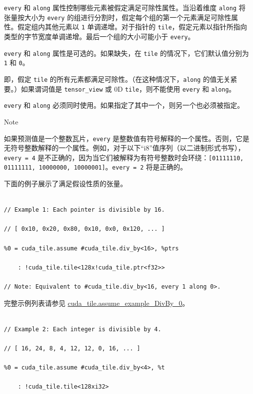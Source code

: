 \documentclass{article}
\begin{document}
\texttt{every} 和 \texttt{along} 属性控制哪些元素被假定满足可除性属性。当沿着维度 \texttt{along} 将张量按大小为 \texttt{every} 的组进行分割时，假定每个组的第一个元素满足可除性属性。假定组内其他元素以 \texttt{1} 单调递增。对于指针的 \texttt{tile}，假定元素以指针所指向类型的字节宽度单调递增。最后一个组的大小可能小于 \texttt{every}。



\texttt{every} 和 \texttt{along} 属性是可选的。如果缺失，在 \texttt{tile} 的情况下，它们默认值分别为 \texttt{1} 和 \texttt{0}。

即，假定 \texttt{tile} 的所有元素都满足可除性。（在这种情况下，\texttt{along} 的值无关紧要。）如果谓词值是 \texttt{tensor\_view} 或 0D \texttt{tile}，则不能使用 \texttt{every} 和 \texttt{along}。



\texttt{every} 和 \texttt{along} 必须同时使用。如果指定了其中一个，则另一个也必须被指定。



Note




如果预测值是一个整数瓦片，\texttt{every} 是整数值有符号解释的一个属性。否则，它是无符号整数解释的一个属性。例如，对于以下``i8''值序列（以二进制形式书写），\texttt{every = 4} 是不正确的，因为当它们被解释为有符号整数时会环绕：\texttt{[01111110, 01111111, 10000000, 10000001]}。\texttt{every = 2} 将是正确的。



下面的例子展示了满足假设性质的张量。



\begin{lstlisting}

// Example 1: Each pointer is divisible by 16.

// [ 0x10, 0x20, 0x80, 0x10, 0x0, 0x120, ... ]

%0 = cuda_tile.assume #cuda_tile.div_by<16>, %ptrs

    : !cuda_tile.tile<128x!cuda_tile.ptr<f32>>

// Note: Equivalent to #cuda_tile.div_by<16, every 1 along 0>.

\end{lstlisting}



完整示例列表请参见 \href{https://docs.nvidia.com/cuda/tile-ir/latest/sections/appendix.html#example-cuda-tile-assume-example-divby-0}{cuda\_tile.assume\_example\_DivBy\_0}。



\begin{lstlisting}

// Example 2: Each integer is divisible by 4.

// [ 16, 24, 8, 4, 12, 12, 0, 16, ... ]

%0 = cuda_tile.assume #cuda_tile.div_by<4>, %t

    : !cuda_tile.tile<128xi32>

\end{lstlisting}
\end{document}

